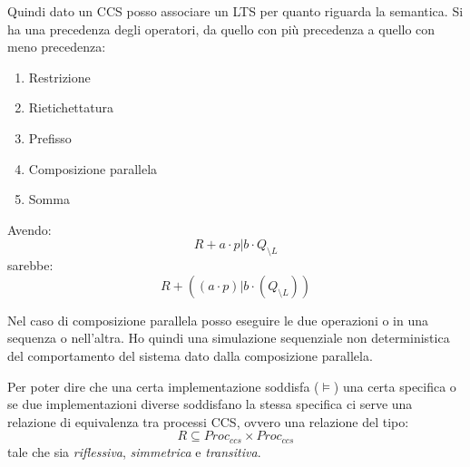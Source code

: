 Quindi dato un CCS posso associare un LTS per quanto riguarda la semantica. Si
ha una precedenza degli operatori, da quello con più precedenza a quello con meno precedenza:
\begin{enumerate}
    \item Restrizione
    \item Rietichettatura
    \item Prefisso
    \item Composizione parallela
    \item Somma
\end{enumerate}
\begin{esempio} 
    Avendo: $$R + a \cdot p | b \cdot Q_{\setminus L}$$ sarebbe: $$R + ((a \cdot p) | b \cdot (Q_{\setminus L}))$$
\end{esempio}
Nel caso di composizione parallela posso eseguire le due operazioni o in una
sequenza o nell'altra. Ho quindi una simulazione sequenziale non deterministica
del comportamento del sistema dato dalla composizione parallela.

Per poter dire che una certa implementazione soddisfa ($\models$) una certa
specifica o se due implementazioni diverse soddisfano la stessa specifica ci
serve una relazione di equivalenza tra processi CCS, ovvero una relazione del
tipo:
\begin{equation}
    R \subseteq Proc_{ccs} \times Proc_{ccs}
\end{equation}
tale che sia \textit{riflessiva}, \textit{simmetrica} e \textit{transitiva}.

